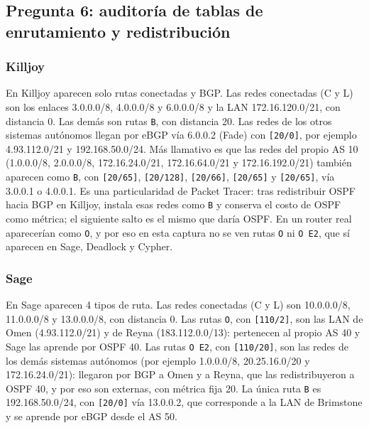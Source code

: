 \subsection{Pregunta 6: auditoría de tablas de enrutamiento y redistribución}

\subsubsection*{Killjoy}
En Killjoy aparecen solo rutas conectadas y BGP. Las redes conectadas (C y L) son los enlaces 3.0.0.0/8, 4.0.0.0/8 y 6.0.0.0/8 y la LAN 172.16.120.0/21, con distancia 0. Las demás son rutas \texttt{B}, con distancia 20. Las redes de los otros sistemas autónomos llegan por eBGP vía 6.0.0.2 (Fade) con \texttt{[20/0]}, por ejemplo 4.93.112.0/21 y 192.168.50.0/24.
Más llamativo es que las redes del propio AS 10 (1.0.0.0/8, 2.0.0.0/8, 172.16.24.0/21, 172.16.64.0/21 y 172.16.192.0/21) también aparecen como \texttt{B}, con \texttt{[20/65]}, \texttt{[20/128]}, \texttt{[20/66]}, \texttt{[20/65]} y \texttt{[20/65]}, vía 3.0.0.1 o 4.0.0.1. Es una particularidad de Packet Tracer:
tras redistribuir OSPF hacia BGP en Killjoy, instala esas redes como \texttt{B} y conserva el costo de OSPF como métrica; el siguiente salto es el mismo que daría OSPF. En un router real aparecerían como \texttt{O}, y por eso en esta captura no se ven rutas \texttt{O} ni \texttt{O E2}, que sí aparecen en Sage, Deadlock y Cypher.

\subsubsection*{Sage}
En Sage aparecen 4 tipos de ruta. Las redes conectadas (C y L) son 10.0.0.0/8, 11.0.0.0/8 y 13.0.0.0/8, con distancia 0. Las rutas \texttt{O}, con \texttt{[110/2]}, son las LAN de Omen (4.93.112.0/21) y de Reyna (183.112.0.0/13):
pertenecen al propio AS 40 y Sage las aprende por OSPF 40. Las rutas \texttt{O E2}, con \texttt{[110/20]}, son las redes de los demás sistemas autónomos (por ejemplo 1.0.0.0/8, 20.25.16.0/20 y 172.16.24.0/21): llegaron por BGP a Omen y a Reyna, que las 
redistribuyeron a OSPF 40, y por eso son externas, con métrica fija 20. La única ruta \texttt{B} es 192.168.50.0/24, con \texttt{[20/0]} vía 13.0.0.2, que corresponde a la LAN de Brimstone y se aprende por eBGP desde el AS 50.

